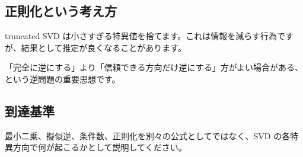 \documentclass[
  11pt,
  a4paper,
]{ltjsarticle}
\begin{document}
\hypertarget{ux6b63ux5247ux5316ux3068ux3044ux3046ux8003ux3048ux65b9}{%
\subsection{正則化という考え方}\label{ux6b63ux5247ux5316ux3068ux3044ux3046ux8003ux3048ux65b9}}

truncated SVD
は小さすぎる特異値を捨てます。これは情報を減らす行為ですが、結果として推定が良くなることがあります。

「完全に逆にする」より「信頼できる方向だけ逆にする」方がよい場合がある、という逆問題の重要思想です。

\hypertarget{ux5230ux9054ux57faux6e96}{%
\subsection{到達基準}\label{ux5230ux9054ux57faux6e96}}

最小二乗、擬似逆、条件数、正則化を別々の公式としてではなく、SVD
の各特異方向で何が起こるかとして説明してください。
\end{document}
